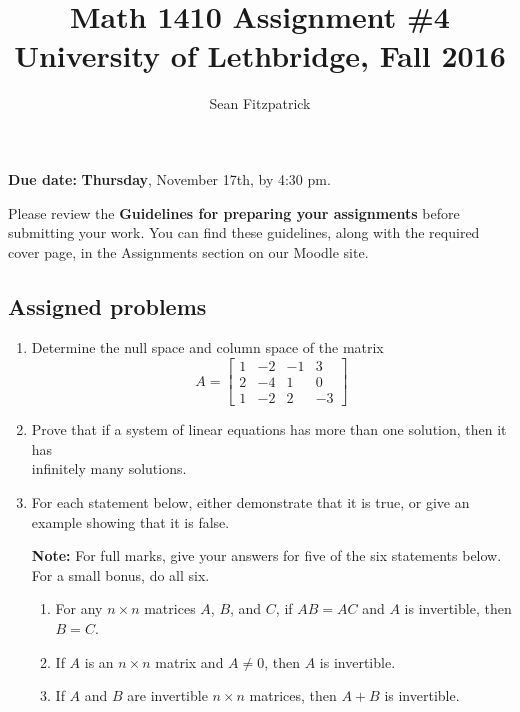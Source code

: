 \documentclass[letterpaper,12pt]{amsart}
\title{Math 1410 Assignment \#4\\University of Lethbridge, Fall 2016}
\author{Sean Fitzpatrick}
\newcommand{\bbm}{\begin{bmatrix}}
\newcommand{\ebm}{\end{bmatrix}}
\begin{document}
 \maketitle

{\bf Due date:} {\bf Thursday}, November 17th, by 4:30 pm.

\bigskip

Please review the {\bf Guidelines for preparing your assignments} before submitting your work. You can find these guidelines, along with the required cover page, in the Assignments section on our Moodle site.



\subsection*{Assigned problems}
\begin{enumerate}
\item Determine the null space and column space of the matrix
\[
 A = \bbm 1&-2&-1&3\\2&-4&1&0\\1&-2&2&-3\ebm
\]

\bigskip


\item Prove that if a system of linear equations has more than one solution, then it has\\infinitely many solutions.

\bigskip

\item For each statement below, either demonstrate that it is true, or give an example showing that it is false.

\medskip

{\bf Note:} For full marks, give your answers for five of the six statements below. For a small bonus, do all six.

\medskip

\begin{enumerate}
 \item For any $n\times n$ matrices $A$, $B$, and $C$, if $AB=AC$ and $A$ is invertible, then $B=C$.

\medskip

 \item If $A$ is an $n\times n$ matrix and $A\neq 0$, then $A$ is invertible.

\medskip

 \item If $A$ and $B$ are invertible $n\times n$ matrices, then $A+B$ is invertible.


\end{enumerate}
\end{enumerate}
\end{document}
